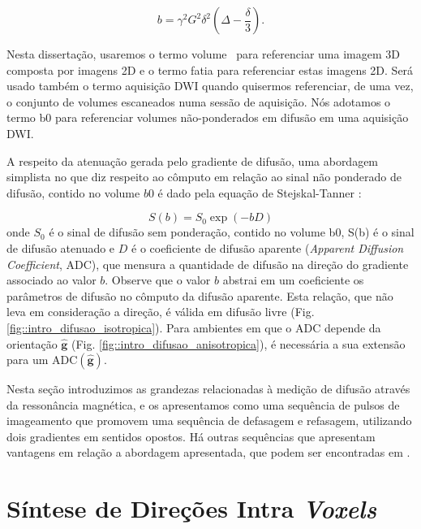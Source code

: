 \documentclass[
    12pt,                %
    oneside,            %
    a4paper,            %
    english,            %
    french,                %
    spanish,            %
    brazil                %
    ]{abntex2}
\begin{document}
\begin{equation}
\label{eq::bvalue}
    b = \gamma^2G^2\delta^2(\Delta - \frac{\delta}{3}).
\end{equation}

Nesta dissertação, usaremos o termo \textsf{volume} ~para referenciar uma imagem 3D composta por imagens 2D e o termo \textsf{fatia} para referenciar estas imagens 2D. Será usado também o termo \textsf{aquisição DWI} quando quisermos referenciar, de uma vez, o conjunto de volumes escaneados numa sessão de aquisição. Nós adotamos o termo \textsf{b0}  para referenciar volumes não-ponderados em difusão em uma aquisição DWI.



A respeito da atenuação gerada pelo gradiente de difusão, uma abordagem simplista no que diz respeito ao cômputo em relação ao sinal não ponderado de difusão, contido no volume $b0$ é dado pela equação de Stejskal-Tanner \cite{DTI_Handbook}:

\begin{equation}
\label{eq::stanner}
    S(b) = S_0\exp{(-bD)}
\end{equation}
onde $S_0$ é o sinal de difusão sem ponderação, contido no volume b0, S(b) é o sinal de difusão atenuado e $D$ é o coeficiente de difusão aparente (\textit{Apparent Diffusion Coefficient}, ADC), que mensura a quantidade de difusão na direção do gradiente associado ao valor $b$. Observe que o valor $b$ abstrai em um coeficiente os parâmetros de difusão no cômputo da difusão aparente. Esta relação, que não leva em consideração a direção, é válida em difusão livre (Fig. \ref{fig::intro_difusao_isotropica}). Para ambientes em que o ADC depende da orientação $\mathbf{\hat{g}}$ (Fig. \ref{fig::intro_difusao_anisotropica}), é necessária a sua extensão para um ADC$(\mathbf{\hat{g}})$.

\todo[inline]{\textcolor{green}{Adicionei este parágrafo pois acho importante frisar que esta sequência não é única e há outras com mais vantagens, mas que fogem do escopo do trabalho}}

Nesta seção introduzimos as grandezas relacionadas à medição de difusão através da ressonância magnética, e os apresentamos como uma sequência de pulsos de imageamento que promovem uma sequência de defasagem e refasagem, utilizando dois gradientes em sentidos opostos. Há outras sequências que apresentam vantagens em relação a abordagem apresentada, que podem ser encontradas em .

\section{Síntese de Direções Intra \textit{Voxels}}
\end{document}
